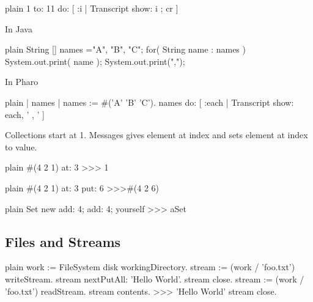 \documentclass[10pt,twoside,english]{_support/latex/sbabook/sbabook}
\begin{document}
\begin{displaycode}{plain}
1 to: 11 do: [ :i | Transcript show: i ; cr ] 
\end{displaycode}

In Java

\begin{displaycode}{plain}
String [] names ={"A", "B", "C"};
for( String name : names ) { 
     System.out.print( name );  
     System.out.print(","); }  
\end{displaycode}

In Pharo

\begin{displaycode}{plain}
| names | 
names := #('A' 'B' 'C').
names do: [ :each | Transcript show: each, ' , ' ]
\end{displaycode}

Collections start at 1. Messages  gives element at index and  sets element at index to value.

\begin{displaycode}{plain}
#(4 2 1) at: 3
>>> 1 
\end{displaycode}

\begin{displaycode}{plain}
#(4 2 1) at: 3 put: 6
>>>#(4 2 6) 
\end{displaycode}

\begin{displaycode}{plain}
Set new add: 4; add: 4; yourself
>>> aSet 
\end{displaycode}
\subsection{Files and Streams}
\begin{displaycode}{plain}
work := FileSystem disk workingDirectory. 
stream := (work / 'foo.txt') writeStream. 
stream nextPutAll: 'Hello World'. 
stream close. 
stream := (work / 'foo.txt') readStream. 
stream contents. 
>>> 'Hello World' 
stream close.
\end{displaycode}


\backmatter



\end{document}

